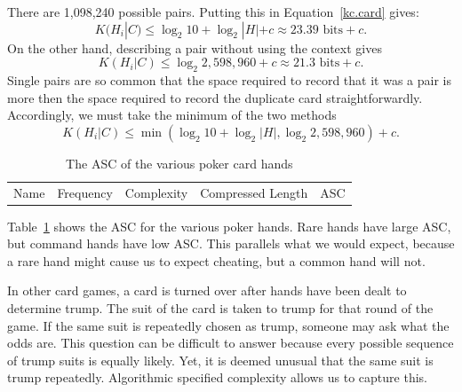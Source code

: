 There are 1,098,240 possible pairs.
Putting this in Equation~\ref{kc.card} gives:
\begin{equation}
    K(H_i|C) \leq \log_2 10 + \log_2 |H| + c \approx 23.39 \mbox{ bits} + c \mbox{.}
\end{equation}
On the other hand, describing a pair without using the context gives
\begin{equation}
    K(H_i|C) \leq \log_2 2,598,960 + c \approx 21.3 \mbox{ bits} + c \mbox{.}
\end{equation}
Single pairs are so common that the space required to record that it was a pair is more then the space required to record the duplicate card straightforwardly. 
Accordingly, we must take the minimum of the two methods
\begin{equation}
    K(H_i|C) \leq \min(\log_2 10 + \log_2 |H|, \log_2 2,598,960) + c \mbox{.}
\end{equation}

\begin{table}
    \begin{center}
    \begin{tabular}{lllll}
        Name & Frequency & Complexity & Compressed Length & ASC \\
        
    \end{tabular}
    \end{center}
    \caption{The ASC of the various poker card hands}
    \label{asc.hands}
\end{table}
Table~\ref{asc.hands} shows the ASC for the various poker hands.
Rare hands have large ASC, but command hands have low ASC.
This parallels what we would expect, because a rare hand might cause us to expect cheating, but a common hand will not.

In other card games, a card is turned over after hands have been dealt to determine trump.
The suit of the card is taken to trump for that round of the game.
If the same suit is repeatedly chosen as trump, someone may ask what the odds are.
This question can be difficult to answer because every possible sequence of trump suits is equally likely.
Yet, it is deemed unusual that the same suit is trump repeatedly.
Algorithmic specified complexity allows us to capture this.

